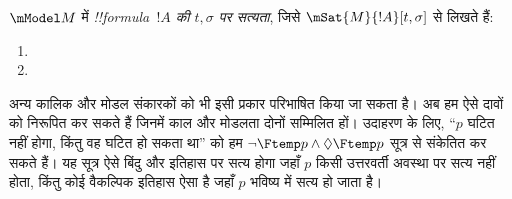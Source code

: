 \documentclass[../../../include/open-logic-section]{subfiles}
\begin{document}
\begin{defn}
  $\mModel M$ में \emph{!!{formula}~$!A$ की $t, \sigma$ पर सत्यता}, जिसे
  $\mSat{M}{!A}[t, \sigma]$ से लिखते हैं:
  \begin{enumerate}
  \item{} 
  \item{} 
  \end{enumerate} 
\end{defn}

अन्य कालिक और मोडल संकारकों को भी इसी प्रकार परिभाषित किया जा सकता है। अब
हम ऐसे दावों को निरूपित कर सकते हैं जिनमें काल और मोडलता दोनों सम्मिलित हों।
उदाहरण के लिए, ``$p$ घटित नहीं होगा, किंतु वह घटित हो सकता था'' को हम
$\lnot \Ftemp p \land \Diamond \Ftemp p$ सूत्र से संकेतित कर सकते हैं। यह
सूत्र ऐसे बिंदु और इतिहास पर सत्य होगा जहाँ $p$ किसी उत्तरवर्ती अवस्था पर
सत्य नहीं होता, किंतु कोई वैकल्पिक इतिहास ऐसा है जहाँ $p$ भविष्य में सत्य
हो जाता है।
\end{document}
